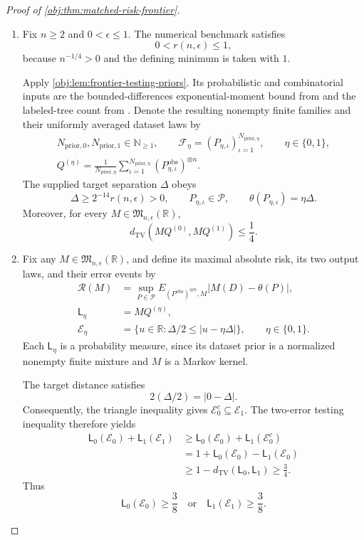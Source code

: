\begin{proof}[Proof of \cref{obj:thm:matched-risk-frontier}]
\begin{enumerate}
\item Fix \(n\ge2\) and \(0<\epsilon\le1\). The numerical benchmark satisfies
\[
0<r(n,\epsilon)\le1,
\]
because \(n^{-1/4}>0\) and the defining minimum is taken with \(1\).

Apply \cref{obj:lem:frontier-testing-priors}. Its probabilistic and combinatorial inputs are the bounded-differences exponential-moment bound from \citep[Theorem 6.2, displayed log-mgf conclusion in its proof, p.~167]{BoucheronLugosiMassart2013} and the labeled-tree count from \citep[Section 5.6, Theorem 5.40]{KellerTrotterAppliedCombinatorics}. Denote the resulting nonempty finite families and their uniformly averaged dataset laws by
\[
\begin{gathered}
N_{\mathrm{prior},0},N_{\mathrm{prior},1}\in\mathbb N_{\ge1},
\qquad
\mathcal F_\eta
=
(P_{\eta,\iota})_{\iota=1}^{N_{\mathrm{prior},\eta}},
\qquad \eta\in\{0,1\},\\
Q^{(\eta)}
=
\frac{1}{N_{\mathrm{prior},\eta}}
\sum_{\iota=1}^{N_{\mathrm{prior},\eta}}
(P_{\eta,\iota}^{\mathrm{obs}})^{\otimes n}.
\end{gathered}
\]
The supplied target separation \(\Delta\) obeys
\[
\Delta\ge2^{-14}r(n,\epsilon)>0,
\qquad
P_{\eta,\iota}\in\mathcal P,
\qquad
\theta(P_{\eta,\iota})=\eta\Delta.
\]
Moreover, for every \(M\in\mathfrak M_{n,\epsilon}(\mathbb R)\),
\[
d_{\mathrm{TV}}\!\left(MQ^{(0)},MQ^{(1)}\right)\le\frac14.
\]

\item Fix any \(M\in\mathfrak M_{n,\epsilon}(\mathbb R)\), and define its maximal absolute risk, its two output laws, and their error events by
\[
\begin{aligned}
\mathcal R(M)
&=
\sup_{P\in\mathcal P}
E_{(P^{\mathrm{obs}})^{\otimes n},M}
|M(D)-\theta(P)|,\\
\mathsf L_\eta&=MQ^{(\eta)},\\
\mathcal E_\eta
&=
\{u\in\mathbb R:\Delta/2\le |u-\eta\Delta|\},
\qquad \eta\in\{0,1\}.
\end{aligned}
\]
Each \(\mathsf L_\eta\) is a probability measure, since its dataset prior is a normalized nonempty finite mixture and \(M\) is a Markov kernel.

The target distance satisfies
\[
2(\Delta/2)=|0-\Delta|.
\]
Consequently, the triangle inequality gives
\(\mathcal E_0^c\subseteq\mathcal E_1\). The two-error testing inequality therefore yields
\[
\begin{aligned}
\mathsf L_0(\mathcal E_0)+\mathsf L_1(\mathcal E_1)
&\ge
\mathsf L_0(\mathcal E_0)+\mathsf L_1(\mathcal E_0^c)\\
&=
1+\mathsf L_0(\mathcal E_0)-\mathsf L_1(\mathcal E_0)\\
&\ge
1-d_{\mathrm{TV}}(\mathsf L_0,\mathsf L_1)
\ge\frac34.
\end{aligned}
\]
Thus
\[
\mathsf L_0(\mathcal E_0)\ge\frac38
\quad\text{or}\quad
\mathsf L_1(\mathcal E_1)\ge\frac38.
\]


\end{enumerate}
\end{proof}
